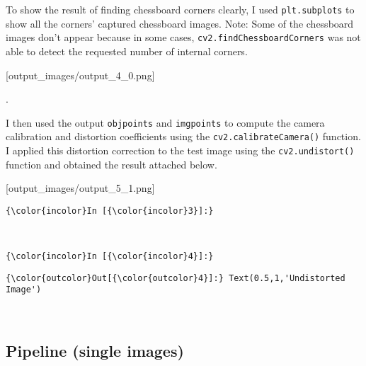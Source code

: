 \documentclass[11pt]{article}
\begin{document}
To show the result of finding chessboard corners clearly, I used
\texttt{plt.subplots} to show all the corners' captured chessboard
images. Note: Some of the chessboard images don't appear because in some
cases, \texttt{cv2.findChessboardCorners} was not able to detect the
requested number of internal corners.

{[}output\_images/output\_4\_0.png{]}

.

I then used the output \texttt{objpoints} and \texttt{imgpoints} to
compute the camera calibration and distortion coefficients using the
\texttt{cv2.calibrateCamera()} function. I applied this distortion
correction to the test image using the \texttt{cv2.undistort()} function
and obtained the result attached below.

{[}output\_images/output\_5\_1.png{]}

    \begin{Verbatim}[commandchars=\\\{\}]
{\color{incolor}In [{\color{incolor}3}]:}         
\end{Verbatim}


    \begin{center}
    \end{center}
    { \hspace*{\fill} \\}
    
    \begin{Verbatim}[commandchars=\\\{\}]
{\color{incolor}In [{\color{incolor}4}]:} 
\end{Verbatim}


\begin{Verbatim}[commandchars=\\\{\}]
{\color{outcolor}Out[{\color{outcolor}4}]:} Text(0.5,1,'Undistorted Image')
\end{Verbatim}
            
    \begin{center}
    \end{center}
    { \hspace*{\fill} \\}
    
    \hypertarget{pipeline-single-images}{%
\subsection{Pipeline (single images)}\label{pipeline-single-images}}
\end{document}
